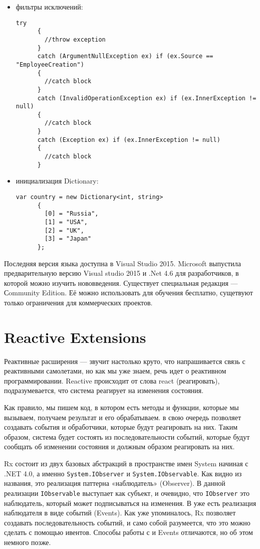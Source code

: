 \begin{itemize}
  \item фильтры исключений:
    \begin{lstlisting}[style=csharpinlinestyle]
      try
      {
        //throw exception
      }
      catch (ArgumentNullException ex) if (ex.Source == "EmployeeCreation")
      {
        //catch block
      }
      catch (InvalidOperationException ex) if (ex.InnerException != null)
      {
        //catch block
      }
      catch (Exception ex) if (ex.InnerException != null)
      {
        //catch block
      }
    \end{lstlisting}
  \item инициализация Dictionary:
    \begin{lstlisting}[style=csharpinlinestyle]
      var country = new Dictionary<int, string>
      {
        [0] = "Russia",
        [1] = "USA",
        [2] = "UK",
        [3] = "Japan"
      };
    \end{lstlisting}
\end{itemize}

Последняя версия языка доступна в Visual Studio 2015. Microsoft выпустила предварительную версию Visual studio 2015 и .Net 4.6 для разработчиков,
в которой можно изучить нововведения. Существует специальная редакция --- Сommunity Edition. Её можно использовать для обучения бесплатно, сущетвуют только ограничения для коммерческих проектов.

\section{Reactive Extensions}
\label{sub:practice:reactive_extensions}

Реактивные расширения — звучит настолько круто, что напрашивается связь с реактивными самолетами, но как мы уже знаем, речь идет о реактивном программировании.
Reactive происходит от слова react (реагировать), подразумевается, что система реагирует на изменения состояния.

Как правило, мы пишем код, в котором есть методы и функции, которые мы вызываем, получаем результат и его обрабатываем. \rx{} в свою очередь позволяет создавать события и обработчики,
которые будут реагировать на них. Таким образом, система будет состоять из последовательности событий, которые будут сообщать об изменении состояния и должным образом реагировать на них.

Rx состоит из двух базовых абстракций в пространстве имен System начиная с .NET 4.0, а именно \lstinline[style=csharpinlinestyle]!System.IObserver! и \lstinline[style=csharpinlinestyle]!System.IObservable!.
Как видно из названия, это реализация паттерна «наблюдатель» (Observer). В данной реализации \lstinline[style=csharpinlinestyle]!IObservable! выступает как субъект,
и очевидно, что \lstinline[style=csharpinlinestyle]!IObserver! это наблюдатель, который может подписываться на изменения.
В \dotnet{} уже есть реализация наблюдателя в виде событий (Events). Как уже упоминалось, Rx позволяет создавать последовательность событий, и само собой разумеется,
что это можно сделать с помощью ивентов. Способы работы с \rx{} и Events отличаются, но об этом немного позже.

